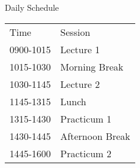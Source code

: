 \begin{frame}{Daily Schedule}
  \begin{table}
    \centering
    \begin{tabular}{ll}
      Time&Session\\
      0900-1015&Lecture 1\\
      1015-1030&Morning Break\\
      1030-1145&Lecture 2\\
      1145-1315&Lunch\\
      1315-1430&Practicum 1\\
      1430-1445&Afternoon Break\\
      1445-1600&Practicum 2
    \end{tabular}
  \end{table}
\caption{Daily Schedule Weeks 1 and 2}
\end{frame}

